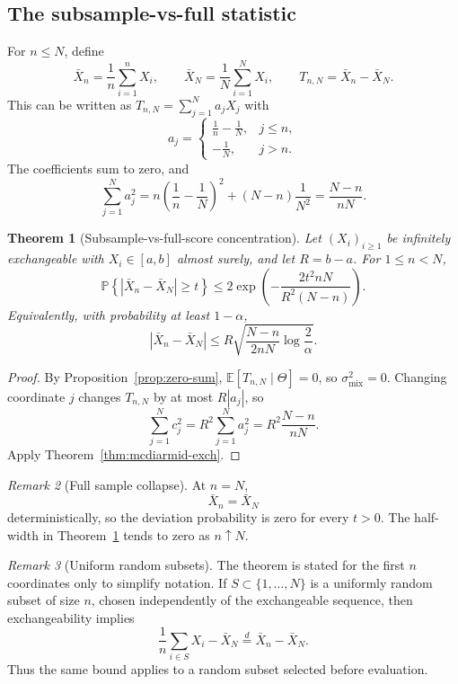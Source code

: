 \documentclass[11pt]{article}
\newcommand{\E}{\mathbb{E}}
\newcommand{\Pbb}{\mathbb{P}}
\newtheorem{theorem}{Theorem}[section]
\theoremstyle{definition}
\theoremstyle{remark}
\newtheorem{remark}[theorem]{Remark}
\begin{document}
\subsection{The subsample-vs-full statistic}

For $n\le N$, define
\[
    \bar X_n=\frac1n\sum_{i=1}^n X_i,
    \qquad
    \bar X_N=\frac1N\sum_{i=1}^N X_i,
    \qquad
    T_{n,N}=\bar X_n-\bar X_N.
\]
This can be written as $T_{n,N}=\sum_{j=1}^N a_jX_j$ with
\[
    a_j=
    \begin{cases}
        \frac1n-\frac1N, & j\le n,\\[3pt]
        -\frac1N, & j>n.
    \end{cases}
\]
The coefficients sum to zero, and
\[
    \sum_{j=1}^N a_j^2
    =
    n\left(\frac1n-\frac1N\right)^2
    +(N-n)\frac1{N^2}
    =
    \frac{N-n}{nN}.
\]


\begin{theorem}[Subsample-vs-full-score concentration]\label{thm:subsample-full}
Let $(X_i)_{i\ge1}$ be infinitely exchangeable with $X_i\in[a,b]$ almost surely, and let $R=b-a$.  For $1\le n<N$,
\[
    \Pbb\left\{|\bar X_n-\bar X_N|\ge t\right\}
    \le
    2\exp\!\left(
        -\frac{2t^2 nN}{R^2(N-n)}
    \right).
\]
Equivalently, with probability at least $1-\alpha$,
\[
    |\bar X_n-\bar X_N|
    \le
    R\sqrt{\frac{N-n}{2nN}\log\frac{2}{\alpha}}.
\]
\end{theorem}

\begin{proof}
By Proposition~\ref{prop:zero-sum}, $\E[T_{n,N}\mid\Theta]=0$, so $\sigma_{\mathrm{mix}}^2=0$.  Changing coordinate $j$ changes $T_{n,N}$ by at most $R|a_j|$, so
\[
    \sum_{j=1}^N c_j^2
    =
    R^2\sum_{j=1}^N a_j^2
    =
    R^2\frac{N-n}{nN}.
\]
Apply Theorem~\ref{thm:mcdiarmid-exch}.
\end{proof}

\begin{remark}[Full sample collapse]\label{rem:n-equals-N}
At $n=N$,
\[
    \bar X_n=\bar X_N
\]
deterministically, so the deviation probability is zero for every $t>0$.  The half-width in Theorem~\ref{thm:subsample-full} tends to zero as $n\uparrow N$.
\end{remark}


\begin{remark}[Uniform random subsets]\label{rem:random-subset}
The theorem is stated for the first $n$ coordinates only to simplify notation.  If $S\subset\{1,\ldots,N\}$ is a uniformly random subset of size $n$, chosen independently of the exchangeable sequence, then exchangeability implies
\[
    \frac1n\sum_{i\in S}X_i-\bar X_N
    \stackrel{d}{=}
    \bar X_n-\bar X_N.
\]
Thus the same bound applies to a random subset selected before evaluation.
\end{remark}
\end{document}
